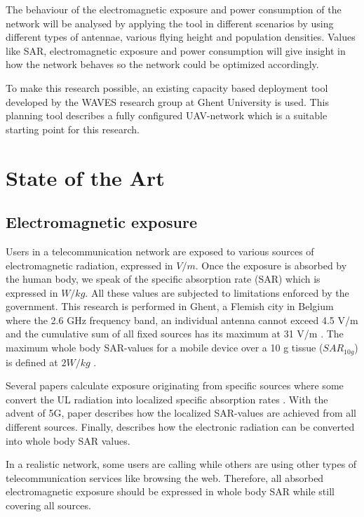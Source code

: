 \documentclass[twocolumn]{phdsymp} %
\begin{document}
The behaviour of the electromagnetic exposure and power consumption of the network will be analysed
 by applying the tool in different scenarios by using different types of antennae, various flying height and population 
densities.
Values like \gls{SAR}, electromagnetic exposure and power consumption will 
 give insight in how the network behaves so the network could be optimized accordingly.

To make this research possible, 
an existing capacity based deployment tool developed by the WAVES research group at Ghent University is used.
This planning tool describes a fully configured \gls{UAV}-network which is a suitable starting point for this research.


\section{State of the Art}
\subsection{Electromagnetic exposure}

Users in a telecommunication network are exposed to various sources of electromagnetic radiation, expressed in $V/m$. Once the exposure is absorbed by the human 
body, we speak of the specific absorption rate (SAR) which is expressed in $W/kg$. All these values are 
subjected to limitations enforced by the government. This research is performed in Ghent, 
a Flemish city in Belgium where the 2.6 GHz frequency band, an individual antenna cannot exceed 4.5 V/m and the cumulative sum of all 
fixed sources has its maximum at 31 V/m \cite{J23,S13_normenBelgie}. The maximum whole body SAR-values for a mobile device 
over a 10 g tissue ($SAR_{10g}$) is defined at $2 W/kg$ \cite{J30}. 

Several papers calculate exposure originating from specific sources  \cite{J6_originalExposureFormula,J1,J10_RDP,J10.1} 
where some convert the \gls{UL} radiation into localized specific absorption rates \cite{J10_RDP,J10.1}. 
With the advent of 5G, paper \cite{J17_kuehn2019modelling} describes 
how the localized \gls{SAR}-values are achieved from all different sources.
Finally, \cite{J22_plets2015joint} describes how the electronic radiation can be converted into whole body SAR values.

In a realistic network, some users are calling while others are using other types of telecommunication services like browsing the web.
Therefore, all absorbed electromagnetic exposure should be expressed in whole body SAR while still covering all sources.
\end{document}
